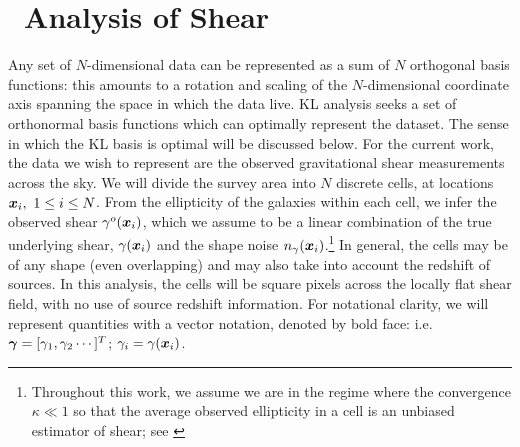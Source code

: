\newpage

















\section{\KL\ Analysis of Shear}
\label{KL_Intro}
Any set of $N$-dimensional data can be represented as a sum of 
$N$ orthogonal basis functions: this amounts to a rotation and scaling of 
the $N$-dimensional coordinate axis spanning the space in which the data live.
KL analysis seeks a set of orthonormal basis functions which can optimally
represent the dataset.  The sense in which the KL basis is optimal will be
discussed below.  For the current work, the data we wish to represent are the 
observed gravitational shear measurements across the sky.  
We will divide the survey 
area into $N$ discrete cells, at locations $\myvec{x}_i,\ 1\le i \le N$.  
From the ellipticity of the galaxies within each cell, 
we infer the observed shear $\gamma^o(\boldsymbol{x}_i)$, which we assume
to be a linear combination of the true underlying shear, $\gamma(\boldsymbol{x}_i)$
and the shape noise $n_\gamma(\boldsymbol{x}_i)$.\footnote{
Throughout this work, we assume we are in the regime where the convergence
$\kappa \ll 1$ so that the average observed ellipticity in a 
cell is an unbiased estimator of shear; see \citet{Bartelmann01}}
In general, the cells may be of any shape (even overlapping) 
and may also take into account the redshift of sources.
In this analysis, the cells will be square pixels across the locally 
flat shear field, with no use of source redshift information.  
For notational clarity, we will represent quantities with a vector notation,
denoted by bold face: i.e. $\boldsymbol{\gamma} = [\gamma_1,\gamma_2\cdots]^T$; 
$\gamma_i = \gamma(\boldsymbol{x}_i)$. 

